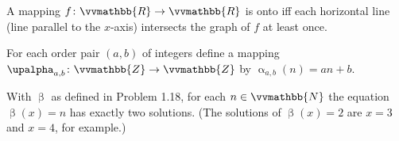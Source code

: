 \documentclass{exam}
\begin{document}
\begin{questions}
    \vspace{0.3cm}

    \question A mapping \( f \colon \vvmathbb{R} \to \vvmathbb{R} \) is onto iff each horizontal line (line parallel to the \( x \)-axis) intersects the graph of \( f \) at least once.


    \vspace{0.3cm}

    \question For each order pair \( \left( a, b \right) \) of integers define a mapping \( \upalpha_{a,b} \colon \vvmathbb{Z} \to \vvmathbb{Z} \) by \( \upalpha_{a,b} \left( n \right) = an + b \).


    \vspace{0.3cm}

    \question With \( \upbeta \) as defined in Problem 1.18, for each \( n \in \vvmathbb{N} \) the equation \( \upbeta \left( x \right) = n \) has exactly two solutions. (The solutions of \( \upbeta \left( x \right) = 2 \) are \( x = 3 \) and \( x = 4 \), for example.)

\end{questions}
\end{document}
